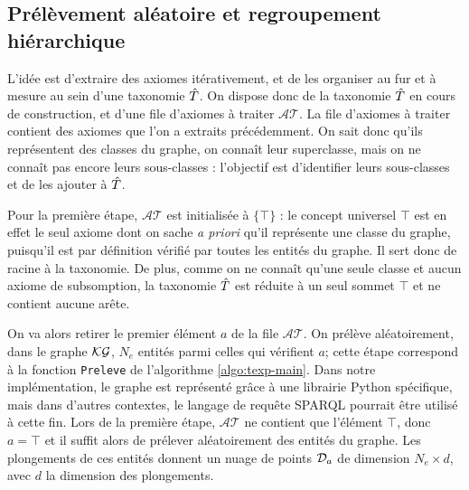 \subsection{Prélèvement aléatoire et regroupement hiérarchique}
\label{subsec:texp-clustering}



L'idée est d'extraire des axiomes itérativement, et de les organiser au fur et à mesure au sein d'une taxonomie $\Tpred$. On dispose donc de la taxonomie $\Tpred$ en cours de construction, et d'une file d'axiomes à traiter $\mathcal{AT}$. 
%
La file d'axiomes à traiter contient des axiomes que l'on a extraits précédemment. On sait donc qu'ils représentent des classes du graphe, on connaît leur superclasse, mais on ne connaît pas encore leurs sous-classes : l'objectif est d'identifier leurs sous-classes et de les ajouter à $\Tpred$. 
%

Pour la première étape, $\mathcal{AT}$ est initialisée à $\{\top\}$ : le concept universel $\top$ est en effet le seul axiome dont on sache \textit{a priori} qu'il représente une classe du graphe, 
puisqu'il est par définition vérifié par toutes les entités du graphe. Il sert donc de racine à la taxonomie.
De plus, comme on ne connaît qu'une seule classe et aucun axiome de subsomption, la taxonomie $\Tpred$ est réduite à un seul sommet $\top$ et ne contient aucune arête. 

On va alors retirer le premier élément $a$ de la file $\mathcal{AT}$.  %
On prélève aléatoirement, dans le graphe $\KG$, $N_e$ entités parmi celles qui vérifient $a$; cette étape correspond à la fonction \texttt{Preleve} de l'algorithme \ref{algo:texp-main}. Dans notre implémentation, le graphe est représenté grâce à une librairie Python spécifique, mais dans d'autres contextes, le langage de requête SPARQL pourrait être utilisé à cette fin.
%
Lors de la première étape, $\mathcal{AT}$ ne contient que l'élément $\top$, donc $a = \top$ et il suffit alors de prélever aléatoirement des entités du graphe. Les plongements de ces entités donnent un nuage de points $\cal{D}_a$ de dimension $N_e \times d$, avec $d$ la dimension des plongements.

